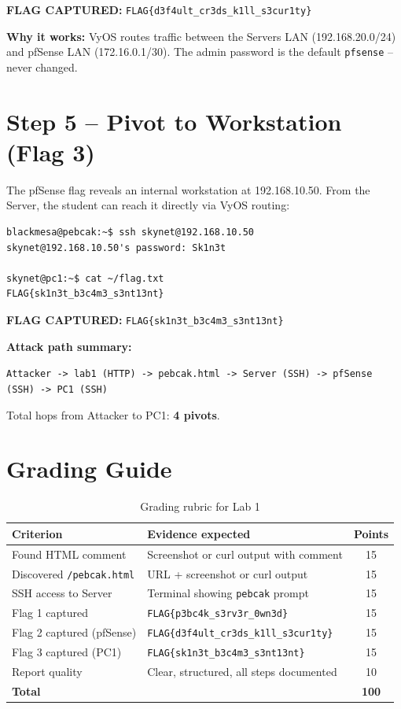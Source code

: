 \documentclass[a4paper, 12pt]{article}
\newcommand{\flag}[1]{%
  \begin{mdframed}[backgroundcolor=flagcolor!10, linecolor=flagcolor, linewidth=1.5pt]
  \textbf{\color{flagcolor}FLAG CAPTURED:} \texttt{#1}
  \end{mdframed}
}
\begin{document}
\flag{FLAG\{d3f4ult\_cr3ds\_k1ll\_s3cur1ty\}}

\textbf{Why it works:} VyOS routes traffic between the Servers LAN
(192.168.20.0/24) and pfSense LAN (172.16.0.1/30). The admin password
is the default \texttt{pfsense} -- never changed.

\section{Step 5 -- Pivot to Workstation (Flag 3)}

The pfSense flag reveals an internal workstation at 192.168.10.50.
From the Server, the student can reach it directly via VyOS routing:

\begin{lstlisting}
blackmesa@pebcak:~$ ssh skynet@192.168.10.50
skynet@192.168.10.50's password: Sk1n3t

skynet@pc1:~$ cat ~/flag.txt
FLAG{sk1n3t_b3c4m3_s3nt13nt}
\end{lstlisting}

\flag{FLAG\{sk1n3t\_b3c4m3\_s3nt13nt\}}

\textbf{Attack path summary:}
\begin{center}
\texttt{Attacker -> lab1 (HTTP) -> pebcak.html -> Server (SSH) -> pfSense (SSH) -> PC1 (SSH)}
\end{center}

Total hops from Attacker to PC1: \textbf{4 pivots}.

\section{Grading Guide}

\begin{table}[H]
\centering
\begin{tabularx}{\textwidth}{Xlc}
\toprule
\textbf{Criterion} & \textbf{Evidence expected} & \textbf{Points} \\
\midrule
Found HTML comment            & Screenshot or curl output with comment    & 15 \\
Discovered \texttt{/pebcak.html} & URL + screenshot or curl output        & 15 \\
SSH access to Server          & Terminal showing \texttt{pebcak} prompt   & 15 \\
Flag 1 captured               & \texttt{FLAG\{p3bc4k\_s3rv3r\_0wn3d\}}   & 15 \\
Flag 2 captured (pfSense)     & \texttt{FLAG\{d3f4ult\_cr3ds\_k1ll\_s3cur1ty\}} & 15 \\
Flag 3 captured (PC1)         & \texttt{FLAG\{sk1n3t\_b3c4m3\_s3nt13nt\}} & 15 \\
Report quality                & Clear, structured, all steps documented   & 10 \\
\midrule
\textbf{Total}                &                                           & \textbf{100} \\
\bottomrule
\end{tabularx}
\caption{Grading rubric for Lab 1}
\end{table}
\end{document}
